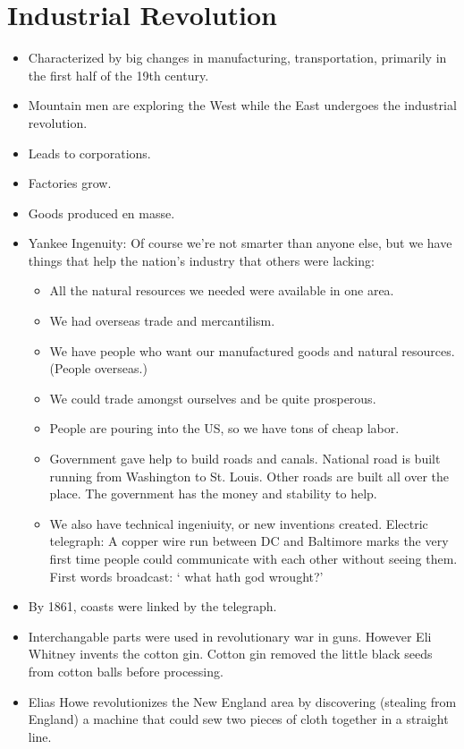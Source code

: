 \documentclass{article}
\begin{document}
\section{Industrial Revolution}
  \begin{itemize}
    \item Characterized by big changes in manufacturing, transportation, primarily in the first half of the 19th century. 
    \item Mountain men are exploring the West while the East undergoes the industrial revolution.
    \item Leads to corporations.
    \item Factories grow.
    \item Goods produced en masse.
    \item Yankee Ingenuity: Of course we're not smarter than anyone else, but we have things that help the nation's industry that others were lacking:
      \begin{itemize}
        \item All the natural resources we needed were available in one area.
        \item We had overseas trade and mercantilism.
        \item We have people who want our manufactured goods and natural resources. (People overseas.)
        \item We could trade amongst ourselves and be quite prosperous.
        \item People are pouring into the US, so we have tons of cheap labor.
        \item Government gave help to build roads and canals. National road is built running from Washington to St. Louis. Other roads are built all over the place. The government has the money and stability to help.
        \item We also have technical ingeniuity, or new inventions created. Electric telegraph: A copper wire run between DC and Baltimore marks the very first time people could communicate with each other without seeing them. First words broadcast: ` what hath god wrought?'
      \end{itemize}       
    \item By 1861, coasts were linked by the telegraph. 
    \item Interchangable parts were used in revolutionary war in guns. However Eli Whitney invents the cotton gin. Cotton gin removed the little black seeds from cotton balls before processing. 
    \item Elias Howe revolutionizes the New England area by discovering (stealing from England) a machine that could sew two pieces of cloth together in a straight line. 

\end{itemize}
\end{document}
